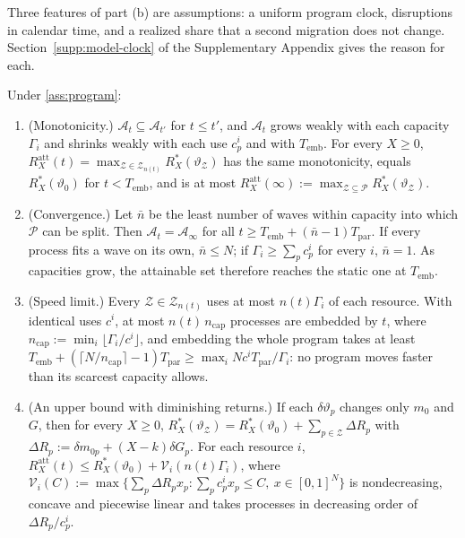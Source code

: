 Three features of part (b) are assumptions: a uniform program clock, disruptions in calendar time, and a realized share that a second migration does not change. Section~\ref{supp:model-clock} of the Supplementary Appendix gives the reason for each.

\begin{proposition}\label{prop:attainable}
Under \autoref{ass:program}:
\begin{enumerate}
\item[(a)] (Monotonicity.) $\mathcal A_t\subseteq\mathcal A_{t'}$ for $t\le t'$, and $\mathcal A_t$ grows weakly with each capacity $\Gamma_i$ and shrinks weakly with each use $c^i_p$ and with $T_{\mathrm{emb}}$. For every $X\ge0$, $R^{\mathrm{att}}_X(t)=\max_{\mathcal Z\in\mathcal Z_{n(t)}}R^*_X(\vartheta_{\mathcal Z})$ has the same monotonicity, equals $R^*_X(\vartheta_0)$ for $t<T_{\mathrm{emb}}$, and is at most $R^{\mathrm{att}}_X(\infty):=\max_{\mathcal Z\subseteq\mathcal P}R^*_X(\vartheta_{\mathcal Z})$.
\item[(b)] (Convergence.) Let $\bar n$ be the least number of waves within capacity into which $\mathcal P$ can be split. Then $\mathcal A_t=\mathcal A_\infty$ for all $t\ge T_{\mathrm{emb}}+(\bar n-1)T_{\mathrm{par}}$. If every process fits a wave on its own, $\bar n\le N$; if $\Gamma_i\ge\sum_pc^i_p$ for every $i$, $\bar n=1$. As capacities grow, the attainable set therefore reaches the static one at $T_{\mathrm{emb}}$.
\item[(c)] (Speed limit.) Every $\mathcal Z\in\mathcal Z_{n(t)}$ uses at most $n(t)\Gamma_i$ of each resource. With identical uses $c^i$, at most $n(t)\,n_{\mathrm{cap}}$ processes are embedded by $t$, where $n_{\mathrm{cap}}:=\min_i\lfloor\Gamma_i/c^i\rfloor$, and embedding the whole program takes at least $T_{\mathrm{emb}}+(\lceil N/n_{\mathrm{cap}}\rceil-1)T_{\mathrm{par}}\ge\max_iNc^iT_{\mathrm{par}}/\Gamma_i$: no program moves faster than its scarcest capacity allows.
\item[(d)] (An upper bound with diminishing returns.) If each $\delta\vartheta_p$ changes only $m_0$ and $G$, then for every $X\ge0$, $R^*_X(\vartheta_{\mathcal Z})=R^*_X(\vartheta_0)+\sum_{p\in\mathcal Z}\Delta R_p$ with $\Delta R_p:=\delta m_{0p}+(X-k)\delta G_p$. For each resource $i$, $R^{\mathrm{att}}_X(t)\le R^*_X(\vartheta_0)+\mathcal V_i(n(t)\Gamma_i)$, where $\mathcal V_i(C):=\max\{\sum_p\Delta R_px_p:\sum_pc^i_px_p\le C,\ x\in[0,1]^N\}$ is nondecreasing, concave and piecewise linear and takes processes in decreasing order of $\Delta R_p/c^i_p$.
\end{enumerate}
\end{proposition}

